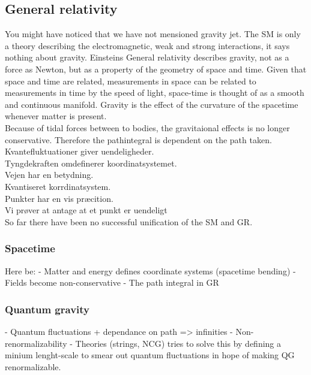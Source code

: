 \subsection{General relativity}
You might have noticed that we have not mensioned gravity jet. The SM is only a theory describing the electromagnetic, weak and strong interactions, it says nothing about gravity. Einsteins General relativity describes gravity, not as a force as Newton, but as a property of the geometry of space and time. Given that space and time are related, measurements in space can be related to measurements in time by the speed of light, space-time is thought of as a smooth and continuous manifold. Gravity is the effect of the curvature of the spacetime whenever matter is present.\\
Because of tidal forces between to bodies, the gravitaional effects is no longer conservative. Therefore the pathintegral is dependent on the path taken.\\
Kvantefluktuationer giver uendeligheder. \\
Tyngdekraften omdefinerer koordinatsystemet.\\ 
Vejen har en betydning. \\
Kvantiseret korrdinatsystem.\\ 
Punkter har en vis præcition. \\
Vi prøver at antage at et punkt er uendeligt \\
So far there have been no successful unification of the SM and GR.

\subsubsection{Spacetime}
Here be:
- Matter and energy defines coordinate systems (spacetime bending)
- Fields become non-conservative
- The path integral in GR

\subsubsection{Quantum gravity}
- Quantum fluctuations + dependance on path => infinities
- Non-renormalizability
- Theories (strings, NCG) tries to solve this by defining a minium lenght-scale
  to smear out quantum fluctuations in hope of making QG renormalizable.